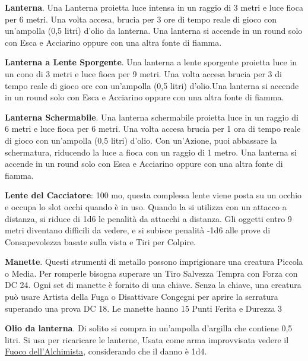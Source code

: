 \begin{multicols}{2}
\textbf{Lanterna}\label{Lanterna}\hypertarget{Lanterna}{}. Una Lanterna proietta luce intensa in un raggio di 3 metri e luce fioca per 6 metri. Una volta accesa, brucia per 3 ore di tempo reale di gioco con un'ampolla (0,5 litri) d'olio da lanterna. Una lanterna si accende in un round solo con Esca e Acciarino oppure con una altra fonte di fiamma.

\textbf{Lanterna a Lente Sporgente}. Una lanterna a lente sporgente proietta luce in un cono di 3 metri e luce fioca per 9 metri. Una volta accesa brucia per 3 di tempo reale di gioco ore con un'ampolla (0,5 litri) d'olio.Una lanterna si accende in un round solo con Esca e Acciarino oppure con una altra fonte di fiamma.

\textbf{Lanterna Schermabile}. Una lanterna schermabile proietta luce in un raggio di 6 metri e luce fioca per 6 metri. Una volta accesa brucia per 1 ora di tempo reale di gioco con un'ampolla (0,5 litri) d'olio. Con un'Azione, puoi abbassare la schermatura, riducendo la luce a fioca con un raggio di 1 metro. Una lanterna si accende in un round solo con Esca e Acciarino oppure con una altra fonte di fiamma.

\textbf{Lente del Cacciatore}: 100 mo, questa complessa lente viene posta su un occhio e occupa lo slot occhi quando è in uso. Quando la si utilizza con un attacco a distanza, si riduce di 1d6 le penalità da attacchi a distanza. Gli oggetti entro 9 metri diventano difficili da vedere, e si subisce penalità -1d6 alle prove di Consapevolezza basate sulla vista e Tiri per Colpire.

\textbf{Manette}\label{Manette}\hypertarget{Manette}{}. Questi strumenti di metallo possono imprigionare una creatura Piccola o Media. Per romperle bisogna superare un Tiro Salvezza Tempra con Forza con DC 24. Ogni set di manette è fornito di una chiave. Senza la chiave, una creatura può usare Artista della Fuga o Disattivare Congegni per aprire la serratura superando una prova DC 18. Le manette hanno 15 Punti Ferita e Durezza 3

\textbf{Olio da lanterna}\hypertarget{Olio da lanterna}{}. Di solito si compra in un'ampolla d'argilla che contiene 0,5 litri. Si usa per ricaricare le lanterne, Usata come arma improvvisata vedere il \hyperlink{Fuoco dell'Alchimista}{Fuoco dell'Alchimista}, considerando che il danno è 1d4.



\end{multicols}
